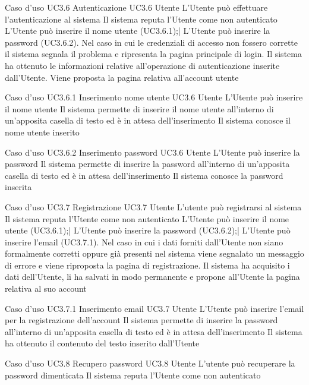 \UCtitle
{Caso d'uso UC3.6}  
{Autenticazione}
\UC		
{UC3.6}		
{Utente}
{L'Utente può effettuare l'autenticazione al sistema}
{Il sistema reputa l'Utente come non autenticato}
\scenario
{L'Utente può inserire il nome utente (UC3.6.1);|
L'Utente può inserire la password (UC3.6.2).
}
\scenarioAlt
{Nel caso in cui le credenziali di accesso non fossero corrette il sistema segnala il problema e ripresenta la pagina principale di login.
}
\post
{Il sistema ha ottenuto le informazioni relative all'operazione di autenticazione inserite dall'Utente. Viene proposta la pagina relativa all'account utente}


\UCtitle
{Caso d'uso UC3.6.1}  
{Inserimento nome utente}
\UC		
{UC3.6}		
{Utente}
{L'Utente può inserire il nome utente}
{Il sistema permette di inserire il nome utente all'interno di un'apposita casella di testo ed è in attesa dell'inserimento}
\post
{Il sistema conosce il nome utente inserito}

\UCtitle
{Caso d'uso UC3.6.2}  
{Inserimento password}
\UC		
{UC3.6}		
{Utente}
{L'Utente può inserire la password}
{Il sistema permette di inserire la password all'interno di un'apposita casella di testo ed è in attesa dell'inserimento}
\post
{Il sistema conosce la password inserita}

\UCtitle
{Caso d'uso UC3.7}  
{Registrazione}
\UC		
{UC3.7}		
{Utente}
{L'utente può registrarsi al sistema}
{Il sistema reputa l'Utente come non autenticato}
\scenario
{L'Utente può inserire il nome utente (UC3.6.1);|
L'Utente può inserire la password (UC3.6.2);|
L'Utente può inserire l'email (UC3.7.1).
}
\scenarioAlt
{Nel caso in cui i dati forniti dall'Utente non siano formalmente corretti oppure già presenti nel sistema viene segnalato un messaggio di errore e viene riproposta la pagina di registrazione.
}
\post
{Il sistema ha acquisito i dati dell'Utente, li ha salvati in modo permanente e propone all'Utente la pagina relativa al suo account}

\UCtitle
{Caso d'uso UC3.7.1}  
{Inserimento email}	
\UC	
{UC3.7}		
{Utente}
{L'Utente può inserire l'email per la registrazione dell'account}
{Il sistema permette di inserire la password all'interno di un'apposita casella di testo ed è in attesa dell'inserimento}
\post
{Il sistema ha ottenuto il contenuto del testo inserito dall'Utente}

\UCtitle
{Caso d'uso UC3.8}  
{Recupero password}	
\UC	
{UC3.8}		
{Utente}
{L'utente può recuperare la password dimenticata}
{Il sistema reputa l'Utente come non autenticato}
